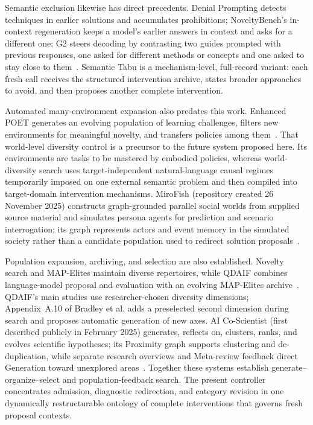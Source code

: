 \documentclass[11pt,a4paper]{article}
\begin{document}
Semantic exclusion likewise has direct precedents. Denial Prompting detects techniques in earlier solutions and accumulates prohibitions; NoveltyBench's in-context regeneration keeps a model's earlier answers in context and asks for a different one; G2 steers decoding by contrasting two guides prompted with previous responses, one asked for different methods or concepts and one asked to stay close to them~\cite{lu2025,zhang2025noveltybench,ruan2025g2}. Semantic Tabu is a mechanism-level, full-record variant: each fresh call receives the structured intervention archive, states broader approaches to avoid, and then proposes another complete intervention.

Automated many-environment expansion also predates this work. Enhanced POET generates an evolving population of learning challenges, filters new environments for meaningful novelty, and transfers policies among them~\cite{wang2020poet}. That world-level diversity control is a precursor to the future system proposed here. Its environments are tasks to be mastered by embodied policies, whereas world-diversity search uses target-independent natural-language causal regimes temporarily imposed on one external semantic problem and then compiled into target-domain intervention mechanisms. MiroFish (repository created 26 November 2025) constructs graph-grounded parallel social worlds from supplied source material and simulates persona agents for prediction and scenario interrogation; its graph represents actors and event memory in the simulated society rather than a candidate population used to redirect solution proposals~\cite{mirofish2025}.

Population expansion, archiving, and selection are also established. Novelty search and MAP-Elites maintain diverse repertoires, while QDAIF combines language-model proposal and evaluation with an evolving MAP-Elites archive~\cite{lehman2011novelty,mouret2015mapelites,bradley2024qdaif}. QDAIF's main studies use researcher-chosen diversity dimensions; Appendix~A.10 of Bradley et al. adds a preselected second dimension during search and proposes automatic generation of new axes. AI Co-Scientist (first described publicly in February 2025) generates, reflects on, clusters, ranks, and evolves scientific hypotheses; its Proximity graph supports clustering and de-duplication, while separate research overviews and Meta-review feedback direct Generation toward unexplored areas~\cite{gottweis2026coscientist}. Together these systems establish generate--organize--select and population-feedback search. The present controller concentrates admission, diagnostic redirection, and category revision in one dynamically restructurable ontology of complete interventions that governs fresh proposal contexts.
\end{document}
